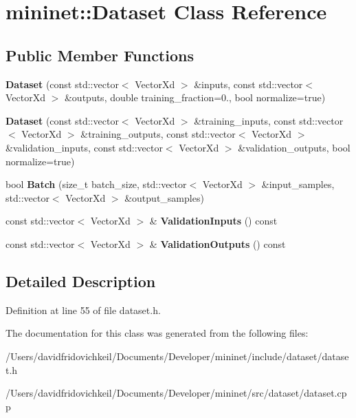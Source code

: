 \hypertarget{classmininet_1_1_dataset}{}\section{mininet\+:\+:Dataset Class Reference}
\label{classmininet_1_1_dataset}
\subsection*{Public Member Functions}
\begin{DoxyCompactItemize}
\item 
\hypertarget{classmininet_1_1_dataset_a01534eefc85dfb4f68450516e595cf8b}{}\label{classmininet_1_1_dataset_a01534eefc85dfb4f68450516e595cf8b} 
{\bfseries Dataset} (const std\+::vector$<$ Vector\+Xd $>$ \&inputs, const std\+::vector$<$ Vector\+Xd $>$ \&outputs, double training\+\_\+fraction=0., bool normalize=true)
\item 
\hypertarget{classmininet_1_1_dataset_ad1b20aab3c1b240473810f9c1beabc0b}{}\label{classmininet_1_1_dataset_ad1b20aab3c1b240473810f9c1beabc0b} 
{\bfseries Dataset} (const std\+::vector$<$ Vector\+Xd $>$ \&training\+\_\+inputs, const std\+::vector$<$ Vector\+Xd $>$ \&training\+\_\+outputs, const std\+::vector$<$ Vector\+Xd $>$ \&validation\+\_\+inputs, const std\+::vector$<$ Vector\+Xd $>$ \&validation\+\_\+outputs, bool normalize=true)
\item 
\hypertarget{classmininet_1_1_dataset_a537e957564a9a742a41dc5da2cc64f9e}{}\label{classmininet_1_1_dataset_a537e957564a9a742a41dc5da2cc64f9e} 
bool {\bfseries Batch} (size\+\_\+t batch\+\_\+size, std\+::vector$<$ Vector\+Xd $>$ \&input\+\_\+samples, std\+::vector$<$ Vector\+Xd $>$ \&output\+\_\+samples)
\item 
\hypertarget{classmininet_1_1_dataset_aa65cbe648ae6ccb85261c2230526f254}{}\label{classmininet_1_1_dataset_aa65cbe648ae6ccb85261c2230526f254} 
const std\+::vector$<$ Vector\+Xd $>$ \& {\bfseries Validation\+Inputs} () const
\item 
\hypertarget{classmininet_1_1_dataset_a027524a596c8cd557c7a54e7c189505c}{}\label{classmininet_1_1_dataset_a027524a596c8cd557c7a54e7c189505c} 
const std\+::vector$<$ Vector\+Xd $>$ \& {\bfseries Validation\+Outputs} () const
\end{DoxyCompactItemize}


\subsection{Detailed Description}


Definition at line 55 of file dataset.\+h.



The documentation for this class was generated from the following files\+:\begin{DoxyCompactItemize}
\item 
/\+Users/davidfridovichkeil/\+Documents/\+Developer/mininet/include/dataset/dataset.\+h\item 
/\+Users/davidfridovichkeil/\+Documents/\+Developer/mininet/src/dataset/dataset.\+cpp\end{DoxyCompactItemize}
